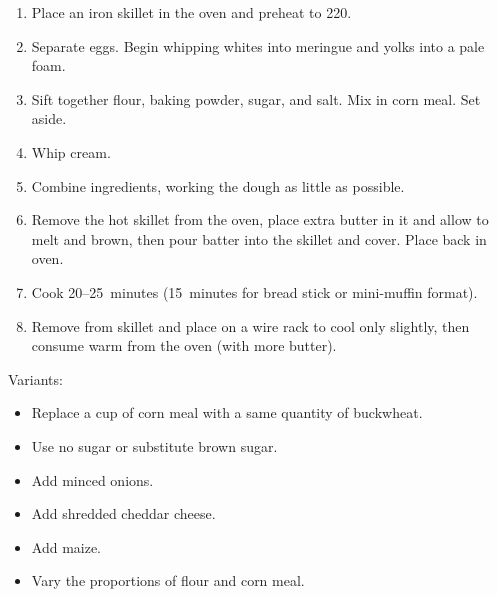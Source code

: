 
\begin{ingredients}
\end{ingredients}


\begin{recipe}
  \begin{enumerate}

  \item Place an iron skillet in the oven and preheat to 220\degreeC{}.

  \item Separate eggs.  Begin whipping whites into meringue and yolks
    into a pale foam.

  \item Sift together flour, baking powder, sugar, and salt.  Mix in
    corn meal.  Set aside.

  \item Whip cream.

  \item Combine ingredients, working the dough as little as possible.

  \item Remove the hot skillet from the oven, place extra butter in it
    and allow to melt and brown, then pour batter into the skillet and
    cover.  Place back in oven.

  \item Cook 20--25~minutes (15~minutes for bread stick or mini-muffin
    format).

  \item Remove from skillet and place on a wire rack to cool only
    slightly, then consume warm from the oven (with more butter).

  \end{enumerate}
\end{recipe}

\notes
Variants:
\begin{itemize}
\item Replace a \fracH cup of corn meal with a same quantity of
  buckwheat.
\item Use no sugar or substitute brown sugar.
\item Add minced onions.
\item Add shredded cheddar cheese.
\item Add maize.
\item Vary the proportions of flour and corn meal.
\end{itemize}


%
%
%
%
